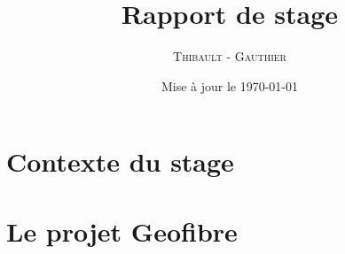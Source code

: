 \documentclass[a4paper, 12pt, onecolumn, openright, oneside]{report}
\title{Rapport de stage}
\author{\textsc{Thibault} - \textsc{Gauthier}}
\date{Mise à  jour  le \today}
\begin{document}
  \maketitle
  
  \tableofcontents
  
  \part{Contexte du stage}
  
  \part{Le projet Geofibre}
  
  
  
  
  
  \appendix
  
  
\end{document}
